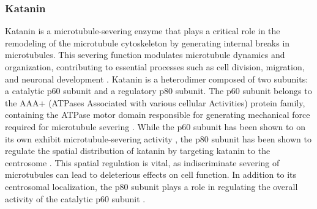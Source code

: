 \subsubsection{Katanin}
\label{sec:katanin_intro}
Katanin is a microtubule-severing enzyme that plays a critical role in the remodeling of the microtubule cytoskeleton by generating internal breaks in microtubules. This severing function modulates microtubule dynamics and organization, contributing to essential processes such as cell division, migration, and neuronal development \parencite{ROLLMECAK201096, Lombino2019}. Katanin is a heterodimer composed of two subunits: a catalytic p60 subunit and a regulatory p80 subunit. The p60 subunit belongs to the AAA+ (ATPases Associated with various cellular Activities) protein family, containing the ATPase motor domain responsible for generating mechanical force required for microtubule severing \parencite{Johjima2015, McNally2014}. While the p60 subunit has been shown to on its own exhibit microtubule-severing activity \parencite{McNally2014}, the p80 subunit has been shown to regulate the spatial distribution of katanin by targeting katanin to the centrosome \parencite{Hartman1998}. This spatial regulation is vital, as indiscriminate severing of microtubules can lead to deleterious effects on cell function. In addition to its centrosomal localization, the p80 subunit plays a role in regulating the overall activity of the catalytic p60 subunit \parencite{McNally2000}. \par

